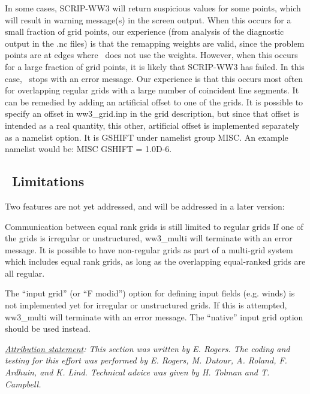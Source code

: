 In some cases, SCRIP-WW3 will return suspicious values for some points, which
will result in warning message(s) in the screen output. When this occurs for a
small fraction of grid points, our experience (from analysis of the diagnostic
output in the {\file .nc} files) is that the remapping weights are valid,
since the problem points are at edges where \ws\ does not use the
weights. However, when this occurs for a large fraction of grid points, it is
likely that SCRIP-WW3 has failed. In this case, \ws\ stops with an error
message. Our experience is that this occurs most often for overlapping regular
grids with a large number of coincident line segments. It can be remedied by
adding an artificial offset to one of the grids. It is possible to specify an
offset in {\file ww3\_grid.inp} in the grid description, but since that offset
is intended as a real quantity, this other, artificial offset is implemented
separately as a namelist option. It is {\code GSHIFT} under namelist group
{\code MISC}. An example namelist would be: {\code MISC GSHIFT = 1.0D-6}.

\vssub
\subsection{~Limitations} \label{sec:scripE}
\vssub

Two features are not yet addressed, and will be addressed in a later version:
\begin{list}{)\hfill}
            { \leftmargin 15mm 
             \rightmargin 5mm \itemsep 0mm \parsep 0mm}
\item  Communication between equal rank grids is still limited to regular
  grids If one of the grids is irregular or unstructured, {\file ww3\_multi}
  will terminate with an error message. It is possible to have non-regular
  grids as part of a multi-grid system which includes equal rank grids, as
  long as the overlapping equal-ranked grids are all regular.

\item The ``input grid'' (or ``{F  modid}'') option for defining input fields
  (e.g. winds) is not implemented yet for irregular or unstructured grids. If
  this is attempted, {\file ww3\_multi} will terminate with an error
  message. The ``native'' input grid option should be used instead.

\end{list}

\noindent
\textrm{\textit{\underline{Attribution statement}: This section was written by
    E. Rogers. The coding and testing for this effort was performed by
    E. Rogers, M. Dutour, A. Roland, F. Ardhuin, and K. Lind. Technical advice
    was given by H. Tolman and T. Campbell.}}

